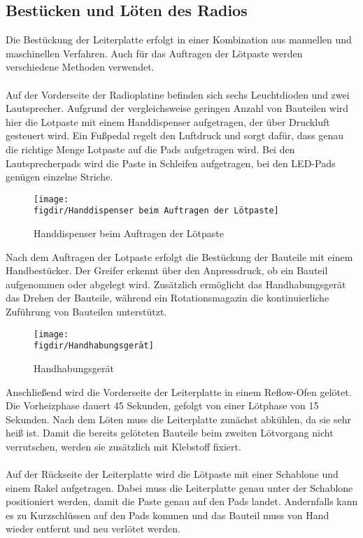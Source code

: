 \subsection{Bestücken und Löten des Radios}
Die Bestückung der Leiterplatte erfolgt in einer Kombination aus manuellen und maschinellen Verfahren.
Auch für das Auftragen der Lötpaste werden verschiedene Methoden verwendet.\\
\\
Auf der Vorderseite der Radioplatine befinden sich sechs Leuchtdioden und zwei Lautsprecher.
Aufgrund der vergleichsweise geringen Anzahl von Bauteilen wird hier die Lotpaste mit einem Handdispenser aufgetragen, der über Druckluft gesteuert wird.
Ein Fußpedal regelt den Luftdruck und sorgt dafür, dass genau die richtige Menge Lotpaste auf die Pads aufgetragen wird.
Bei den Lautsprecherpads wird die Paste in Schleifen aufgetragen, bei den LED-Pads genügen einzelne Striche.

\begin{figure}[H]
    \centering
    \texttt{[image: \\figdir/Handdispenser beim Auftragen der Lötpaste]}
    \caption{Handdispenser beim Auftragen der Lötpaste}
    \label{fig:fig: Abbildung 13}
\end{figure}

\noindent
Nach dem Auftragen der Lotpaste erfolgt die Bestückung der Bauteile mit einem Handbestücker.
Der Greifer erkennt über den Anpressdruck, ob ein Bauteil aufgenommen oder abgelegt wird.
Zusätzlich ermöglicht das Handhabungsgerät das Drehen der Bauteile, während ein Rotationsmagazin die kontinuierliche Zuführung von Bauteilen unterstützt.

\begin{figure}[H]
    \centering
    \texttt{[image: \\figdir/Handhabungsgerät]}
    \caption{Handhabungsgerät}
    \label{fig:fig: Abbildung 14}
\end{figure}

\newpage
\noindent
Anschließend wird die Vorderseite der Leiterplatte in einem Reflow-Ofen gelötet.
Die Vorheizphase dauert 45 Sekunden, gefolgt von einer Lötphase von 15 Sekunden. Nach dem Löten muss die Leiterplatte zunächst abkühlen, da sie sehr heiß ist.
Damit die bereits gelöteten Bauteile beim zweiten Lötvorgang nicht verrutschen, werden sie zusätzlich mit Klebstoff fixiert.\\
\\
Auf der Rückseite der Leiterplatte wird die Lötpaste mit einer Schablone und einem Rakel aufgetragen.
Dabei muss die Leiterplatte genau unter der Schablone positioniert werden, damit die Paste genau auf den Pads landet.
Andernfalls kann es zu Kurzschlüssen auf den Pads kommen und das Bauteil muss von Hand wieder entfernt und neu verlötet werden.

